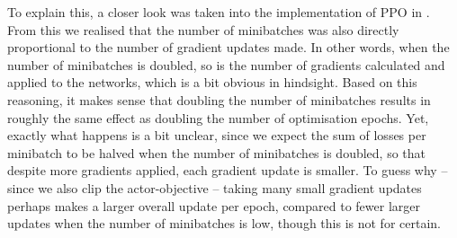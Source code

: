 To explain this, a closer look was taken into the implementation of PPO in \cite{baselines}. From this we realised that the number of minibatches was also directly proportional to the number of gradient updates made. In other words, when the number of minibatches is doubled, so is the number of gradients calculated and applied to the networks, which is a bit obvious in hindsight. 
Based on this reasoning, it makes sense that doubling the number of minibatches results in roughly the same effect as doubling the number of optimisation epochs. 
Yet, exactly what happens is a bit unclear, since we expect the sum of losses per minibatch to be halved when the number of minibatches is doubled, so that despite more gradients applied, each gradient update is smaller. To guess why -- since we also clip the actor-objective -- taking many small gradient updates perhaps makes a larger overall update per epoch, compared to fewer larger updates when the number of minibatches is low, though this is not for certain.


